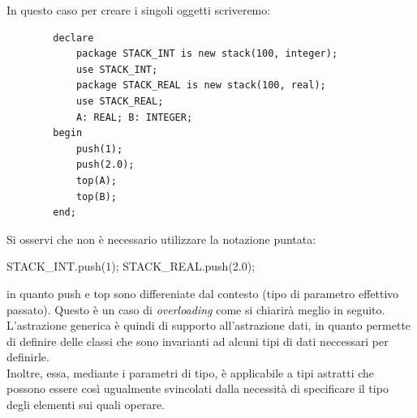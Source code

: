 \documentclass{article}
\begin{document}
	In questo caso per creare i singoli oggetti scriveremo:
	\begin{verbatim}
		declare
			package STACK_INT is new stack(100, integer);
			use STACK_INT;
			package STACK_REAL is new stack(100, real);
			use STACK_REAL;
			A: REAL; B: INTEGER;
		begin
			push(1);
			push(2.0);
			top(A);
			top(B);
		end;
	\end{verbatim}
	Si osservi che non è necessario utilizzare la notazione puntata:
	\begin{center}
		STACK\_INT.push(1);
		STACK\_REAL.push(2.0);
	\end{center}
	in quanto push e top sono differeniate dal contesto (tipo di parametro effettivo passato). Questo è un caso di \textit{overloading} come si chiarirà meglio in seguito.
	\vspace{\baselineskip} \\
	L'astrazione generica è quindi di supporto all'astrazione dati, in quanto permette di definire delle classi che sono invarianti ad alcuni tipi di dati neccessari per definirle. \\
	Inoltre, essa, mediante i parametri di tipo, è applicabile a tipi astratti che possono essere così ugualmente svincolati dalla necessità di specificare il tipo degli elementi sui quali operare.
\end{document}
